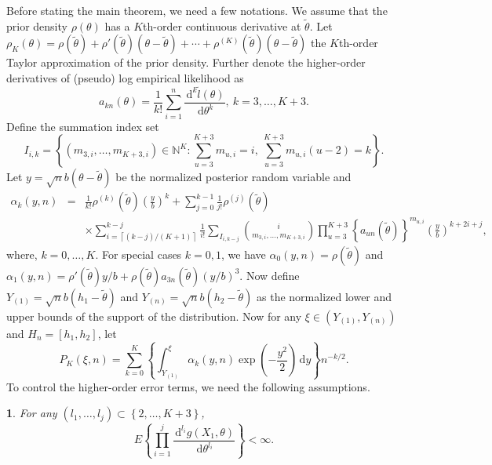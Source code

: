 \documentclass[oneside,english]{amsbook}
\numberwithin{section}{chapter}
\numberwithin{equation}{section}
\numberwithin{figure}{section}
\theoremstyle{plain}
\theoremstyle{plain}
\newtheorem{assumption}{\protect\assumptionname}
\theoremstyle{definition}
\theoremstyle{plain}
\theoremstyle{plain}
\theoremstyle{remark}
\theoremstyle{definition}
\theoremstyle{definition}
\newcommand{\diff}{\,\mathrm{d}}
\providecommand{\assumptionname}{Assumption}
\begin{document}
Before stating the main theorem, we need a few notations. We assume that the
prior density $\rho\left(\theta\right)$ has a $K$th-order continuous derivative
at $\tilde{\theta}$. Let $\rho_{K}\left(\theta\right)=\rho\left(\tilde{\theta}\right)+\rho'\left(\tilde{\theta}\right)\left(\theta-\tilde{\theta}\right)+\cdots+\rho^{\left(K\right)}\left(\tilde{\theta}\right)\left(\theta-\tilde{\theta}\right)$ the $K$th-order  Taylor approximation of the prior density.
Further denote the higher-order derivatives of (pseudo) log empirical
likelihood as 
\[
a_{kn}\left(\theta\right)=\frac{1}{k!}\sum_{i=1}^{n}\frac{\diff^{k}\tilde{l}\left(\theta\right)}{\diff\theta^{k}},\: k=3,\ldots,K+3.
\]
 Define the summation index set 
\[
I_{i,k}=\left\{ \left(m_{3,i},\ldots,m_{K+3,i}\right)\in\mathbb{N}^{K}:\sum_{u=3}^{K+3}m_{u,i}=i,\:\sum_{u=3}^{K+3}m_{u,i}\left(u-2\right)=k\right\} .
\]
 Let $y=\sqrt{n}b\left(\theta-\tilde{\theta}\right)$ be the normalized posterior random variable and 
\begin{eqnarray*}
\alpha_{k}\left(y,n\right) & = & \frac{1}{k!}\rho^{\left(k\right)}\left(\tilde{\theta}\right)\left(\frac{y}{b}\right)^{k}+\sum_{j=0}^{k-1}\frac{1}{j!}\rho^{\left(j\right)}\left(\tilde{\theta}\right)\\
 &  & \times\sum_{i=\left\lceil \left(k-j\right)/\left(K+1\right)\right\rceil }^{k-j}\frac{1}{i!}\sum_{I_{i,k-j}}\binom{i}{m_{3,i},\ldots,m_{K+3,i}}\prod_{u=3}^{K+3}\left\{ a_{un}\left(\tilde{\theta}\right)\right\} ^{m_{u,i}}\left(\frac{y}{b}\right)^{k+2i+j},
\end{eqnarray*}
where, $k=0,\ldots,K$. For special cases $k=0,1$, we have $\alpha_{0}\left(y,n\right)=\rho\left(\tilde{\theta}\right)$
and $\alpha_{1}\left(y,n\right)=\rho'\left(\tilde{\theta}\right)y/b+\rho\left(\tilde{\theta}\right)a_{3n}\left(\tilde{\theta}\right)\left(y/b\right)^{3}.$
Now define $Y_{\left(1\right)}=\sqrt{n}b\left(h_{1}-\tilde{\theta}\right)$
and $Y_{\left(n\right)}=\sqrt{n}b\left(h_{2}-\tilde{\theta}\right)$  as  the normalized lower and upper bounds of the support of the  distribution. Now for any $\xi\in\left(Y_{\left(1\right)},Y_{\left(n\right)}\right)$ 
and $H_n=\left[h_{1},h_{2}\right]$, {let }
\[
P_{K}\left(\xi,n\right)=\sum_{k=0}^{K}\left\{ \int_{Y_{\left(1\right)}}^{\xi}\alpha_{k}\left(y,n\right)\exp\left(-\frac{y^{2}}{2}\right)\diff y\right\} n^{-k/2}.
\]
To control the higher-order error terms, we need the following assumptions.
\begin{assumption}
\label{ass:higher-order-moment-deriv-g}
For any $\left(l_1,\ldots,l_j\right)\subset\left\{2,\ldots,K+3\right\}$,
\[
	E\left\{\prod_{i=1}^j \frac{\diff^{l_i} g\left(X_1,\theta\right)}{\diff \theta^{l_i}}\right\} < \infty.
\]
\end{assumption}
\end{document}
